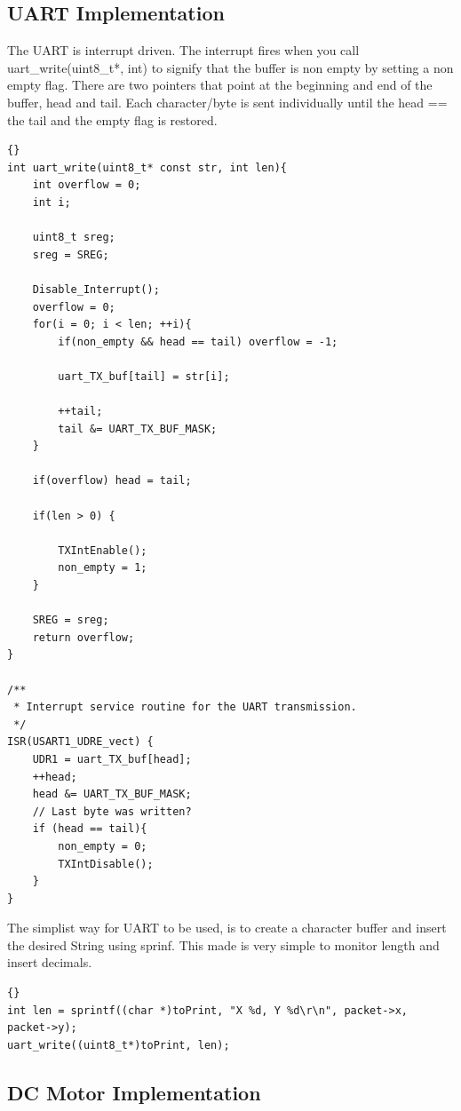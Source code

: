 
\subsection{UART Implementation}
The UART is interrupt driven. The interrupt fires when you call uart\_write(uint8\_t*, int) to signify that the buffer is non empty by setting a non empty flag. There are two pointers that point at the beginning and end of the buffer, head and tail. Each character/byte is sent individually until the head == the tail and the empty flag is restored.

\lstset{language=c}
\lstset{commentstyle=\textit}
\begin{lstlisting}[frame=trbl]{}
int uart_write(uint8_t* const str, int len){
    int overflow = 0;
    int i;

    uint8_t sreg;
    sreg = SREG;

    Disable_Interrupt();
    overflow = 0;
    for(i = 0; i < len; ++i){  
        if(non_empty && head == tail) overflow = -1;

        uart_TX_buf[tail] = str[i];

        ++tail;
        tail &= UART_TX_BUF_MASK;
    }
    
    if(overflow) head = tail;     

    if(len > 0) {

        TXIntEnable();
        non_empty = 1;
    }

    SREG = sreg;
    return overflow; 
}

/**
 * Interrupt service routine for the UART transmission.
 */
ISR(USART1_UDRE_vect) {
    UDR1 = uart_TX_buf[head];
    ++head;
    head &= UART_TX_BUF_MASK;
    // Last byte was written?
    if (head == tail){
        non_empty = 0;
        TXIntDisable();
    }
}
\end{lstlisting}

The simplist way for UART to be used, is to create a character buffer and insert the desired String using sprinf. This made is very simple to monitor length and insert decimals. 

\lstset{language=c}
\lstset{commentstyle=\textit}
\begin{lstlisting}[frame=trbl]{}
int len = sprintf((char *)toPrint, "X %d, Y %d\r\n", packet->x, packet->y);
uart_write((uint8_t*)toPrint, len);
\end{lstlisting}

\subsection{DC Motor Implementation}


